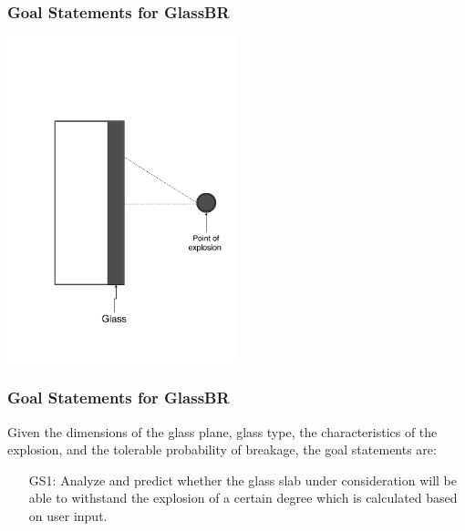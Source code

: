 \documentclass[t,12pt,numbers,fleqn]{beamer}
\begin{document}

\begin{frame}
\frametitle{Goal Statements for GlassBR}

\begin{center}
 \includegraphics[width=0.5\textwidth]{../Figures/physicalsystimage.pdf}
\end{center}

\end{frame}


\begin{frame}
\frametitle{Goal Statements for GlassBR}

Given the dimensions of the glass plane, glass type, the characteristics of the explosion, and
the tolerable probability of breakage, the goal statements are:
\begin{itemize}
\item[GS1:] Analyze and predict whether the
  glass slab under consideration will be able to withstand the explosion of a
  certain degree which is calculated based on user input.
\end{itemize}  

\end{frame}

\end{document}
